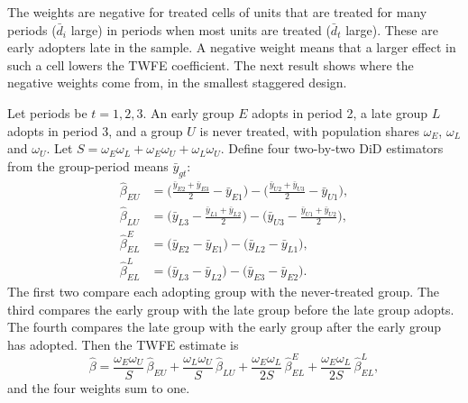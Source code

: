 The weights are negative for treated cells of units that are treated for many periods ($\bar d_i$ large) in periods
when most units are treated ($\bar d_t$ large). These are early adopters late in the sample. A negative weight means
that a larger effect in such a cell lowers the TWFE coefficient. The next result shows where the negative weights
come from, in the smallest staggered design.

\begin{proposition}\label{prop:A-bacon3}
Let periods be $t=1,2,3$. An early group $E$ adopts in period 2, a late group $L$ adopts in period 3, and a group
$U$ is never treated, with population shares $\omega_E$, $\omega_L$ and $\omega_U$. Let
$S=\omega_E\omega_L+\omega_E\omega_U+\omega_L\omega_U$. Define four two-by-two DiD estimators from the group-period
means $\bar y_{gt}$:
\begin{align*}
\hat\beta_{EU}&=\Big(\frac{\bar y_{E2}+\bar y_{E3}}{2}-\bar y_{E1}\Big)-\Big(\frac{\bar y_{U2}+\bar y_{U3}}{2}-\bar y_{U1}\Big),\\
\hat\beta_{LU}&=\Big(\bar y_{L3}-\frac{\bar y_{L1}+\bar y_{L2}}{2}\Big)-\Big(\bar y_{U3}-\frac{\bar y_{U1}+\bar y_{U2}}{2}\Big),\\
\hat\beta^{E}_{EL}&=\big(\bar y_{E2}-\bar y_{E1}\big)-\big(\bar y_{L2}-\bar y_{L1}\big),\\
\hat\beta^{L}_{EL}&=\big(\bar y_{L3}-\bar y_{L2}\big)-\big(\bar y_{E3}-\bar y_{E2}\big).
\end{align*}
The first two compare each adopting group with the never-treated group. The third compares the early group with the
late group before the late group adopts. The fourth compares the late group with the early group after the early
group has adopted. Then the TWFE estimate is
\begin{equation*}
\hat\beta=\frac{\omega_E\omega_U}{S}\,\hat\beta_{EU}+\frac{\omega_L\omega_U}{S}\,\hat\beta_{LU}
+\frac{\omega_E\omega_L}{2S}\,\hat\beta^{E}_{EL}+\frac{\omega_E\omega_L}{2S}\,\hat\beta^{L}_{EL},
\end{equation*}
and the four weights sum to one.
\end{proposition}

